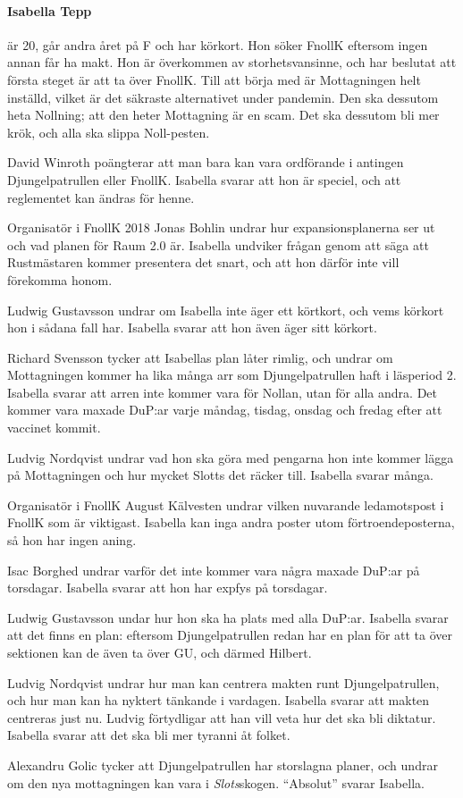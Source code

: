 \documentclass[hidelinks]{sektionsmote} %
\begin{document}
\paragraph{Isabella Tepp} är 20, går andra året på F och har körkort.
Hon söker FnollK eftersom ingen annan får ha makt.
Hon är överkommen av storhetsvansinne, och har beslutat att första steget är att ta över FnollK.
Till att börja med är Mottagningen helt inställd, vilket är det säkraste alternativet under pandemin.
Den ska dessutom heta Nollning; att den heter Mottagning är en scam.
Det ska dessutom bli mer krök, och alla ska slippa Noll-pesten.\par
David Winroth poängterar att man bara kan vara ordförande i antingen Djungelpatrullen eller FnollK.
Isabella svarar att hon är speciel, och att reglementet kan ändras för henne.\par
Organisatör i FnollK 2018 Jonas Bohlin undrar hur expansionsplanerna ser ut och vad planen för Raum 2.0 är.
Isabella undviker frågan genom att säga att Rustmästaren kommer presentera det snart, och att hon därför inte vill förekomma honom.\par
Ludwig Gustavsson undrar om Isabella inte äger ett körtkort, och vems körkort hon i sådana fall har.
Isabella svarar att hon även äger sitt körkort.\par
Richard Svensson tycker att Isabellas plan låter rimlig, och undrar om Mottagningen kommer ha lika många arr som Djungelpatrullen haft i läsperiod 2.
Isabella svarar att arren inte kommer vara för Nollan, utan för alla andra.
Det kommer vara maxade DuP:ar varje måndag, tisdag, onsdag och fredag efter att vaccinet kommit.\par
Ludvig Nordqvist undrar vad hon ska göra med pengarna hon inte kommer lägga på Mottagningen och hur mycket Slotts det räcker till.
Isabella svarar många.\par
Organisatör i FnollK August Kälvesten undrar vilken nuvarande ledamotspost i FnollK som är viktigast.
Isabella kan inga andra poster utom förtroendeposterna, så hon har ingen aning.\par
Isac Borghed undrar varför det inte kommer vara några maxade DuP:ar på torsdagar.
Isabella svarar att hon har expfys på torsdagar.\par
Ludwig Gustavsson undar hur hon ska ha plats med alla DuP:ar.
Isabella svarar att det finns en plan: eftersom Djungelpatrullen redan har en plan för att ta över sektionen kan de även ta över GU, och därmed Hilbert.\par
Ludvig Nordqvist undrar hur man kan centrera makten runt Djungelpatrullen, och hur man kan ha nyktert tänkande i vardagen.
Isabella svarar att makten centreras just nu.
Ludvig förtydligar att han vill veta hur det ska bli diktatur.
Isabella svarar att det ska bli mer tyranni åt folket.\par
Alexandru Golic tycker att Djungelpatrullen har storslagna planer, och undrar om den nya mottagningen kan vara i \textit{Slots}skogen.
\enquote{Absolut} svarar Isabella.
\end{document}
